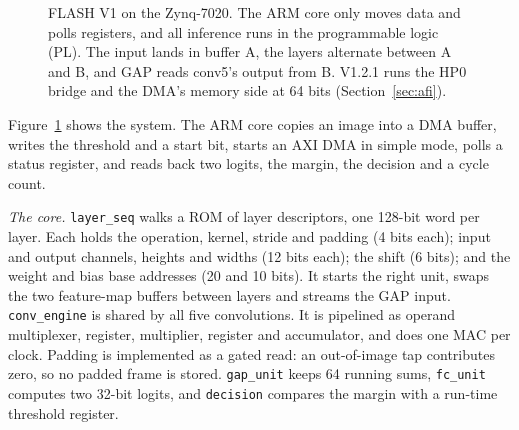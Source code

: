 \documentclass[conference]{IEEEtran}
\newcommand{\code}[1]{\texttt{#1}}
\begin{document}
\begin{figure}[t]
{}
\caption{FLASH V1 on the Zynq-7020. The ARM core only moves data and polls registers, and all
inference runs in the programmable logic (PL). The input lands in buffer A, the layers alternate
between A and B, and GAP reads conv5's output from B. V1.2.1 runs the HP0 bridge and the DMA's
memory side at 64 bits (Section~\ref{sec:afi}).}
\label{fig:arch}
\end{figure}

Figure~\ref{fig:arch} shows the system. The ARM core copies an image into a DMA buffer, writes
the threshold and a start bit, starts an AXI DMA \cite{pg021} in simple mode, polls a status
register, and reads back two logits, the margin, the decision and a cycle count.

\textit{The core.} \code{layer\_seq} walks a ROM of layer descriptors, one 128-bit word per
layer. Each holds the operation, kernel, stride and padding (4 bits each); input and output
channels, heights and widths (12 bits each); the shift (6 bits); and the weight and bias base
addresses (20 and 10 bits). It starts the right unit, swaps the two feature-map buffers between
layers and streams the GAP input. \code{conv\_engine} is shared by all five convolutions. It is
pipelined as operand multiplexer, register, multiplier, register and accumulator, and does one
MAC per clock. Padding is implemented as a gated read: an out-of-image tap contributes zero, so
no padded frame is stored. \code{gap\_unit} keeps 64 running sums, \code{fc\_unit} computes two
32-bit logits, and \code{decision} compares the margin with a run-time threshold register.
\end{document}

